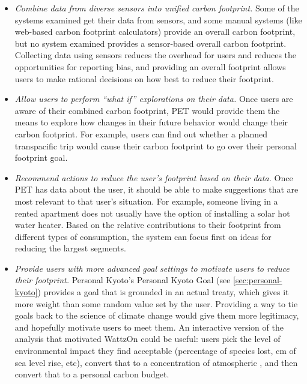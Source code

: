 \begin{itemize}
	\item \emph{Combine data from diverse sensors into unified carbon footprint.} Some of the systems examined get their data from sensors, and some manual systems (like web-based carbon footprint calculators) provide an overall carbon footprint, but no system examined provides a sensor-based overall carbon footprint. Collecting data using sensors reduces the overhead for users and reduces the opportunities for reporting bias, and providing an overall footprint allows users to make rational decisions on how best to reduce their footprint.

	\item \emph{Allow users to perform ``what if'' explorations on their data.} Once users are aware of their combined carbon footprint, PET would provide them the means to explore how changes in their future behavior would change their carbon footprint. For example, users can find out whether a planned transpacific trip would cause their carbon footprint to go over their personal footprint goal.
	
	\item \emph{Recommend actions to reduce the user's footprint based on their data.} Once PET has data about the user, it should be able to make suggestions that are most relevant to that user's situation. For example, someone living in a rented apartment does not usually have the option of installing a solar hot water heater. Based on the relative contributions to their footprint from different types of consumption, the system can focus first on ideas for reducing the largest segments.
	
	\item \emph{Provide users with more advanced goal settings to motivate users to reduce their footprint.} Personal Kyoto's Personal Kyoto Goal (see \autoref{sec:personal-kyoto}) provides a goal that is grounded in an actual treaty, which gives it more weight than some random value set by the user. Providing a way to tie goals back to the science of climate change would give them more legitimacy, and hopefully motivate users to meet them. An interactive version of the analysis that motivated WattzOn could be useful: users pick the level of environmental impact they find acceptable (percentage of species lost, cm of sea level rise, etc), convert that to a concentration of atmospheric \COtwo, and then convert that to a personal carbon budget.


\end{itemize}
